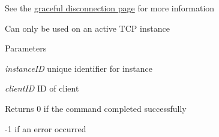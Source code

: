 See the \hyperlink{graceful_disconnect_page}{graceful disconnection page} for more information \par
\par


Can only be used on an active TCP instance


\begin{DoxyParams}{Parameters}
\item[{\em instanceID}]unique identifier for instance \item[{\em clientID}]ID of client\end{DoxyParams}
\begin{DoxyReturn}{Returns}
0 if the command completed successfully 

-\/1 if an error occurred
\end{DoxyReturn}

